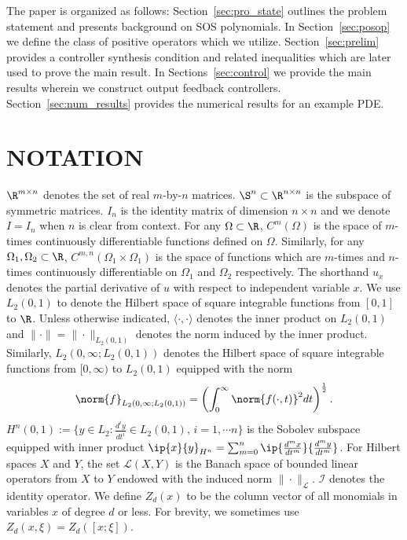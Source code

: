 \documentclass[US letter, 9 pt, conference]{ieeeconf}  \usepackage{setspace}
\newcommand{\lt}{L_2(0,1)}
\newcommand{\mcl}[1]{\mathcal{#1}}
\begin{document}
The paper is organized as follows: Section~\ref{sec:pro_state} outlines the problem statement and presents background on SOS polynomials. In Section~\ref{sec:posop} we define the class of positive operators which we utilize. Section~\ref{sec:prelim} provides a controller synthesis condition and related inequalities which are later used to prove the main result. In Sections~\ref{sec:control} we provide the main results wherein we construct output feedback controllers. Section~\ref{sec:num_results} provides the numerical results for an example PDE.
\section{NOTATION}\label{sec:notation}


$\R^{m \times n}$ denotes the set of real $m$-by-$n$ matrices. $\S^n\subset \R^{n \times n}$ is the subspace of symmetric matrices. $I_n$ is the identity matrix of dimension $n \times n$ and we denote $I=I_n$ when $n$ is clear from context. For any $\Omega \subset \R$, $C^m(\Omega)$ is the space of $m$-times continuously differentiable functions defined on $\Omega$. Similarly, for any $\Omega_1,\Omega_2 \subset \R$, $C^{m,n}(\Omega_1 \times \Omega_1)$ is the space of functions which are $m$-times and $n$-times continuously differentiable on $\Omega_1$ and $\Omega_2$ respectively.  The shorthand $u_x$ denotes the partial derivative of $u$ with respect to independent variable $x$. We use $\lt$ to denote the Hilbert space of square integrable functions from $[0,1]$ to $\R$.
Unless otherwise indicated, $\langle \cdot,\cdot \rangle$ denotes the inner product on $\lt$ and $\|\cdot\|=\|\cdot\|_{\lt}$ denotes the norm induced by the inner product. Similarly, $L_2(0,\infty;\lt)$ denotes the Hilbert space of square integrable functions from $[0,\infty)$ to $\lt$ equipped with the norm
\[\norm{f}_{L_2(0,\infty;\lt)}=\left(\int_0^\infty \norm{f(\cdot,t)}^2 dt \right)^{\frac{1}{2}}.\]
$H^n(0,1):=\{y \in L_2 :\frac{d^{i}y}{dt^{i}}\in \lt,\,i=1,\cdots n\}$ is the Sobolev subspace equipped with inner product $\ip{x}{y}_{H^n} = \sum_{m=0}^n\ip{\frac{d^m x}{dt^m}}{\frac{d^m y}{dt^m}}$. For Hilbert spaces $X$ and $Y$, the set $\mcl{L}(X,Y)$ is the Banach space of bounded linear operators from $X$ to $Y$ endowed with the induced norm $\|\cdot\|_\mathcal{L}$. $\mcl{I}$ denotes the identity operator.
We define $Z_d(x)$ to be the column vector of all monomials in variables $x$ of degree $d$ or less. For brevity, we sometimes use $Z_d(x,\xi) = Z_d([x;\xi])$.
\end{document}
